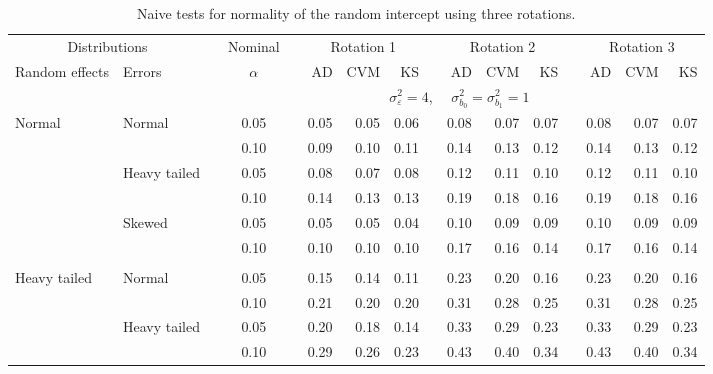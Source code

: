 \documentclass{article} %
\begin{document}
\begin{table}[ht]
\caption{Naive tests for normality of the random intercept using three rotations.}
\begin{scriptsize}
\begin{center}
\begin{tabular}{ll p{.1cm} c p{.1cm} rrr p{.1cm} rrr p{.1cm} rrr}
  \hline
  \multicolumn{2}{c}{Distributions}& & Nominal & &  \multicolumn{3}{c}{Rotation 1} & & \multicolumn{3}{c}{Rotation 2} & & \multicolumn{3}{c}{Rotation 3}\\ \cline{1-2} \cline{6-8} \cline{10-12} \cline{14-16}
  Random effects & Errors & & $\alpha$ & & AD & CVM & KS & & AD & CVM & KS & & AD & CVM & KS \\ 
   \hline
& && && \multicolumn{9}{c}{$\sigma_{\varepsilon}^2 = 4$, \ \ $\sigma_{b_0}^2 = \sigma_{b_1}^2 = 1$} \\ \cline{6-16}
\rowcolor{gray!20}Normal       & Normal       && 0.05 &&   0.05 & 0.05 & 0.06 && 0.08 & 0.07 & 0.07 && 0.08 & 0.07 & 0.07 \\ 
\rowcolor{gray!20}             &              && 0.10 &&   0.09 & 0.10 & 0.11 && 0.14 & 0.13 & 0.12 && 0.14 & 0.13 & 0.12 \\ 
\rowcolor{gray!20}             & Heavy tailed && 0.05 &&   0.08 & 0.07 & 0.08 && 0.12 & 0.11 & 0.10 && 0.12 & 0.11 & 0.10 \\ 
\rowcolor{gray!20}             &              && 0.10 &&   0.14 & 0.13 & 0.13 && 0.19 & 0.18 & 0.16 && 0.19 & 0.18 & 0.16 \\ 
\rowcolor{gray!20}             & Skewed       && 0.05 &&   0.05 & 0.05 & 0.04 && 0.10 & 0.09 & 0.09 && 0.10 & 0.09 & 0.09 \\ 
\rowcolor{gray!20}             &              && 0.10 &&   0.10 & 0.10 & 0.10 && 0.17 & 0.16 & 0.14 && 0.17 & 0.16 & 0.14 \\ 
             &&&&&&&&&&&&&&&\\
Heavy tailed & Normal       && 0.05 &&   0.15 & 0.14 & 0.11 && 0.23 & 0.20 & 0.16 && 0.23 & 0.20 & 0.16 \\ 
             &              && 0.10 &&   0.21 & 0.20 & 0.20 && 0.31 & 0.28 & 0.25 && 0.31 & 0.28 & 0.25 \\ 
             & Heavy tailed && 0.05 &&   0.20 & 0.18 & 0.14 && 0.33 & 0.29 & 0.23 && 0.33 & 0.29 & 0.23 \\ 
             &              && 0.10 &&   0.29 & 0.26 & 0.23 && 0.43 & 0.40 & 0.34 && 0.43 & 0.40 & 0.34 \\ 

\end{tabular}
\end{center}
\end{scriptsize}
\end{table}
\end{document}
